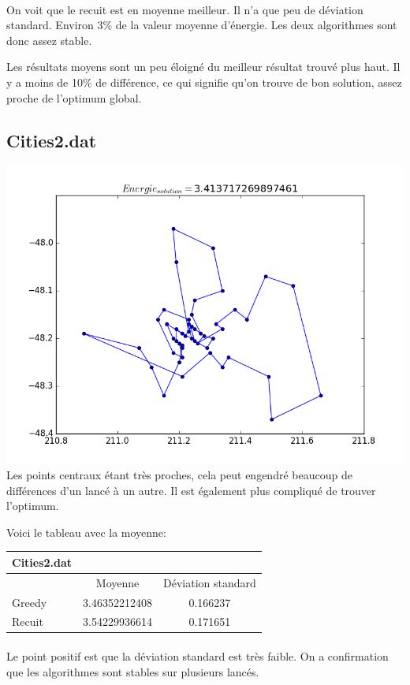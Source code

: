 \documentclass[a4paper, 11pt]{article}
\begin{document}
\paragraph{}On voit que le recuit est en moyenne meilleur. Il n'a que peu de déviation standard. Environ 3\% de la valeur moyenne d'énergie.
Les deux algorithmes sont donc assez stable.	

Les résultats moyens sont un peu éloigné du meilleur résultat trouvé plus haut. Il y a moins de 10\% de différence, ce qui signifie qu'on
trouve de bon solution, assez proche de l'optimum global.

\subsection{Cities2.dat}
\includegraphics[scale=0.75]{cities2}
Les points centraux étant très proches, cela peut engendré beaucoup de différences d'un lancé à un autre. Il est également plus compliqué
de trouver l'optimum.

Voici le tableau avec la moyenne:\\
\begin{tabular}{|l | c |c |}
\hline
Cities2.dat & & \\
\hline
  & Moyenne & Déviation standard\\
 \hline
Greedy & 3.46352212408	& 0.166237\\
\hline
Recuit & 3.54229936614	 & 0.171651\\
\hline
\end{tabular}

\paragraph{}
Le point positif est que la déviation standard est très faible. On a confirmation
que les algorithmes sont stables sur plusieurs lancés.
\end{document}
